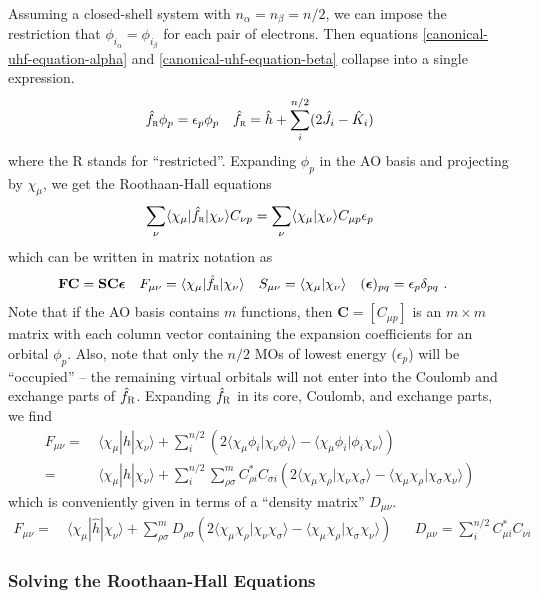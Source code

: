 \documentclass[11pt,fleqn]{article}
\renewcommand{\a}{\alpha}    %
\renewcommand{\b}{\beta}     %
\renewcommand{\d}{\delta}    %
\newcommand{\ev}{\epsilon}   %
\newcommand{\si}{\sigma}     %
\newcommand{\f}{\phi}        %
\newcommand{\x}{\chi}        %
\newcommand{\op}[1]{\ensuremath{\hat{#1}}}
\newcommand{\bo}[1]{\ensuremath{\mathbf{#1}}}
\newcommand{\ip}[1]{\ensuremath{\langle#1\rangle}}
\theoremstyle{mystyle}
\begin{document}
Assuming a closed-shell system with $n_\a=n_\b=n/2$, we can impose the restriction that $\f_{i_\a}=\f_{i_\b}$ for each pair of electrons.
Then equations \ref{canonical-uhf-equation-alpha} and \ref{canonical-uhf-equation-beta} collapse into a single expression.
\begin{align*}
  \op{f}_\textsc{r}\f_p
=
  \ev_p\f_p
&&
  \op{f}_\textsc{r}
=
  \op{h}
+
  \sum_i^{n/2}
  (2\op{J}_i - \op{K}_i)
\end{align*}
where the R stands for ``restricted''.
Expanding $\f_p$ in the AO basis and projecting by $\x_\mu$, we get the Roothaan-Hall equations
\begin{align*}
  \sum_\nu
  \ip{\x_\mu|\op{f}_\textsc{r}|\x_\nu}
  C_{\nu p}
=
  \sum_\nu
  \ip{\x_\mu|\x_\nu}C_{\mu p}\ev_p
\end{align*}
which can be written in matrix notation as
\begin{align}
\label{roothaan-hall}
&
  \bo{F}\bo{C}
=
  \bo{S}\bo{C}\bm{\ev}
&&
  F_{\mu\nu}
=
  \ip{\x_\mu|\op{f}_\textsc{r}|\x_\nu}
&&
  S_{\mu\nu}
=
  \ip{\x_\mu|\x_\nu}
&&
  (\bm{\ev})_{pq}
=
  \ev_p\d_{pq}\ .
\end{align}
Note that if the AO basis contains $m$ functions, then $\bo{C}=[C_{\mu p}]$ is an $m\times m$ matrix with each column vector containing the expansion coefficients for an orbital $\f_p$.
Also, note that only the $n/2$ MOs of lowest energy ($\ev_p$) will be ``occupied'' -- the remaining virtual orbitals will not enter into the Coulomb and exchange parts of $\op{f}_\textsc{R}$.
Expanding $\op{f}_\textsc{R}$ in its core, Coulomb, and exchange parts, we find
\begin{align*}
  F_{\mu\nu}
=&\
  \ip{\x_\mu|\op{h}|\x_\nu}
+
  \sum_i^{n/2}
  (2\ip{\x_\mu\f_i|\x_\nu\f_i}-\ip{\x_\mu\f_i|\f_i\x_\nu})
\\
=&\
  \ip{\x_\mu|\op{h}|\x_\nu}
+
  \sum_i^{n/2}
  \sum_{\rho\si}^m
  C_{\rho i}^*C_{\si i}
  (2\ip{\x_\mu\x_\rho|\x_\nu\x_\si}-\ip{\x_\mu\x_\rho|\x_\si\x_\nu})
\end{align*}
which is conveniently given in terms of a ``density matrix'' $D_{\mu\nu}$.
\begin{align}
\label{rhf-ao-basis-fock}
  F_{\mu\nu}
=&\
  \ip{\x_\mu|\op{h}|\x_\nu}
+
  \sum_{\rho\si}^m
  D_{\rho\si}
  (2\ip{\x_\mu\x_\rho|\x_\nu\x_\si}-\ip{\x_\mu\x_\rho|\x_\si\x_\nu})
&&
  D_{\mu\nu}
=
  \sum_i^{n/2}
  C_{\mu i}^*C_{\nu i}
\end{align}


\subsubsection*{Solving the Roothaan-Hall Equations}
\end{document}
